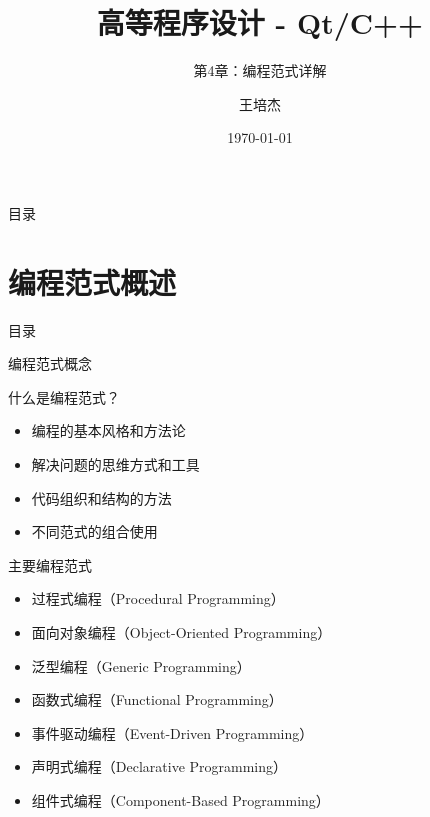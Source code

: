 \documentclass[UTF8,aspectratio=169]{beamer}
\title{高等程序设计 - Qt/C++}
\subtitle{第4章：编程范式详解}
\author{王培杰}
\institute{长江大学地球物理与石油资源学院}
\date{\today}
\begin{document}
\begin{frame}
    \titlepage
\end{frame}

\begin{frame}{目录}
    \begin{multicols}{2}
        \tableofcontents[]
    \end{multicols}
\end{frame}

\section{编程范式概述}
\begin{frame}{目录}
    \begin{multicols}{2}
        \tableofcontents[currentsection]
    \end{multicols}
\end{frame}

\begin{frame}{编程范式概念}
    \begin{ytublock}{什么是编程范式？}
        \begin{itemize}
            \item 编程的基本风格和方法论
            \item 解决问题的思维方式和工具
            \item 代码组织和结构的方法
            \item 不同范式的组合使用
        \end{itemize}
    \end{ytublock}

    \begin{ytublock}{主要编程范式}
        \begin{itemize}
            \item 过程式编程（Procedural Programming）
            \item 面向对象编程（Object-Oriented Programming）
            \item 泛型编程（Generic Programming）
            \item 函数式编程（Functional Programming）
            \item 事件驱动编程（Event-Driven Programming）
            \item 声明式编程（Declarative Programming）
            \item 组件式编程（Component-Based Programming）
        \end{itemize}
    \end{ytublock}
\end{frame}
\end{document}
